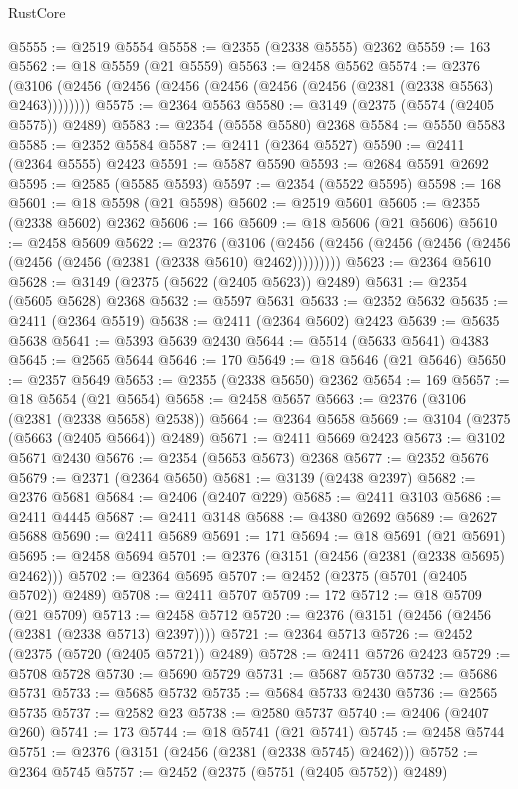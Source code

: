 \begin{lexlean}{RustCore}
\begin{coremodule}
@5555 := @2519 @5554
@5558 := @2355 (@2338 @5555) @2362
@5559 := 163
@5562 := @18 @5559 (@21 @5559)
@5563 := @2458 @5562
@5574 := @2376 (@3106 (@2456 (@2456 (@2456 (@2456 (@2456 (@2456 (@2381 (@2338 @5563) @2463))))))))
@5575 := @2364 @5563
@5580 := @3149 (@2375 (@5574 (@2405 @5575)) @2489)
@5583 := @2354 (@5558 @5580) @2368
@5584 := @5550 @5583
@5585 := @2352 @5584
@5587 := @2411 (@2364 @5527)
@5590 := @2411 (@2364 @5555) @2423
@5591 := @5587 @5590
@5593 := @2684 @5591 @2692
@5595 := @2585 (@5585 @5593)
@5597 := @2354 (@5522 @5595)
@5598 := 168
@5601 := @18 @5598 (@21 @5598)
@5602 := @2519 @5601
@5605 := @2355 (@2338 @5602) @2362
@5606 := 166
@5609 := @18 @5606 (@21 @5606)
@5610 := @2458 @5609
@5622 := @2376
    (@3106 (@2456 (@2456 (@2456 (@2456 (@2456 (@2456 (@2456 (@2381 (@2338 @5610) @2462)))))))))
@5623 := @2364 @5610
@5628 := @3149 (@2375 (@5622 (@2405 @5623)) @2489)
@5631 := @2354 (@5605 @5628) @2368
@5632 := @5597 @5631
@5633 := @2352 @5632
@5635 := @2411 (@2364 @5519)
@5638 := @2411 (@2364 @5602) @2423
@5639 := @5635 @5638
@5641 := @5393 @5639 @2430
@5644 := @5514 (@5633 @5641) @4383
@5645 := @2565 @5644
@5646 := 170
@5649 := @18 @5646 (@21 @5646)
@5650 := @2357 @5649
@5653 := @2355 (@2338 @5650) @2362
@5654 := 169
@5657 := @18 @5654 (@21 @5654)
@5658 := @2458 @5657
@5663 := @2376 (@3106 (@2381 (@2338 @5658) @2538))
@5664 := @2364 @5658
@5669 := @3104 (@2375 (@5663 (@2405 @5664)) @2489)
@5671 := @2411 @5669 @2423
@5673 := @3102 @5671 @2430
@5676 := @2354 (@5653 @5673) @2368
@5677 := @2352 @5676
@5679 := @2371 (@2364 @5650)
@5681 := @3139 (@2438 @2397)
@5682 := @2376 @5681
@5684 := @2406 (@2407 @229)
@5685 := @2411 @3103
@5686 := @2411 @4445
@5687 := @2411 @3148
@5688 := @4380 @2692
@5689 := @2627 @5688
@5690 := @2411 @5689
@5691 := 171
@5694 := @18 @5691 (@21 @5691)
@5695 := @2458 @5694
@5701 := @2376 (@3151 (@2456 (@2381 (@2338 @5695) @2462)))
@5702 := @2364 @5695
@5707 := @2452 (@2375 (@5701 (@2405 @5702)) @2489)
@5708 := @2411 @5707
@5709 := 172
@5712 := @18 @5709 (@21 @5709)
@5713 := @2458 @5712
@5720 := @2376 (@3151 (@2456 (@2456 (@2381 (@2338 @5713) @2397))))
@5721 := @2364 @5713
@5726 := @2452 (@2375 (@5720 (@2405 @5721)) @2489)
@5728 := @2411 @5726 @2423
@5729 := @5708 @5728
@5730 := @5690 @5729
@5731 := @5687 @5730
@5732 := @5686 @5731
@5733 := @5685 @5732
@5735 := @5684 @5733 @2430
@5736 := @2565 @5735
@5737 := @2582 @23
@5738 := @2580 @5737
@5740 := @2406 (@2407 @260)
@5741 := 173
@5744 := @18 @5741 (@21 @5741)
@5745 := @2458 @5744
@5751 := @2376 (@3151 (@2456 (@2381 (@2338 @5745) @2462)))
@5752 := @2364 @5745
@5757 := @2452 (@2375 (@5751 (@2405 @5752)) @2489)

\end{coremodule}
\end{lexlean}
